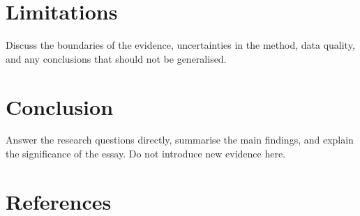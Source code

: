 \documentclass[12pt,letterpaper]{article}
\begin{document}
\section{Limitations}
\label{sec:limitations}
Discuss the boundaries of the evidence, uncertainties in the method, data
quality, and any conclusions that should not be generalised.

\section{Conclusion}
\label{sec:conclusion}
Answer the research questions directly, summarise the main findings, and
explain the significance of the essay. Do not introduce new evidence here.

\clearpage
\section*{References}
\label{sec:references}
\printbibliography[heading=none]
\end{document}
